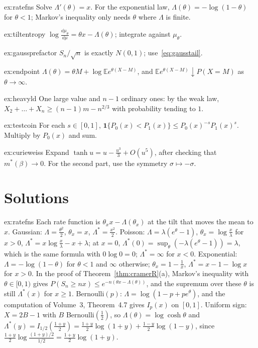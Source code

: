 \begin{hint}{ex:ratefns}
Solve $\Lambda'(\theta)=x$. For the exponential law, $\Lambda(\theta)=-\log(1-\theta)$ for $\theta<1$; Markov's inequality only needs $\theta$ where $\Lambda$ is finite.
\end{hint}
\begin{hint}{ex:tiltentropy}
$\log\frac{\dd\mu_\theta}{\dd\mu}=\theta x-\Lambda(\theta)$; integrate against $\mu_\theta$.
\end{hint}
\begin{hint}{ex:gaussprefactor}
$S_n/\sqrt n$ is exactly $N(0,1)$; use~\eqref{eq:gausstail}.
\end{hint}
\begin{hint}{ex:endpoint}
$\Lambda(\theta)=\theta M+\log\mathbb Ee^{\theta(X-M)}$, and $\mathbb Ee^{\theta(X-M)}\downarrow P(X=M)$ as $\theta\to\infty$.
\end{hint}
\begin{hint}{ex:heavyld}
One large value and $n-1$ ordinary ones: by the weak law, $X_2+\dots+X_n\ge(n-1)m-n^{2/3}$ with probability tending to $1$.
\end{hint}
\begin{hint}{ex:testcoin}
For each $s\in[0,1]$, $\mathbf 1\{P_0(x)<P_1(x)\}\le P_0(x)^{-s}P_1(x)^s$. Multiply by $P_0(x)$ and sum.
\end{hint}
\begin{hint}{ex:curieweiss}
Expand $\tanh u=u-\frac{u^3}3+O(u^5)$, after checking that $m^*(\beta)\to0$. For the second part, use the symmetry $\sigma\mapsto-\sigma$.
\end{hint}

\section{Solutions}

\begin{solution}{ex:ratefns}
\idea Each rate function is $\theta_xx-\Lambda(\theta_x)$ at the tilt that moves the mean to $x$.
\writeup Gaussian: $\Lambda=\frac{\theta^2}2$, $\theta_x=x$, $\Lambda^*=\frac{x^2}2$. Poisson: $\Lambda=\lambda(e^\theta-1)$, $\theta_x=\log\frac x\lambda$ for $x>0$, $\Lambda^*=x\log\frac x\lambda-x+\lambda$; at
$x=0$, $\Lambda^*(0)=\sup_\theta(-\lambda(e^\theta-1))=\lambda$, which is the same formula with $0\log0=0$; $\Lambda^*=\infty$ for $x<0$. Exponential: $\Lambda=-\log(1-\theta)$ for $\theta<1$ and $\infty$
otherwise; $\theta_x=1-\frac1x$, $\Lambda^*=x-1-\log x$ for $x>0$. In the proof of Theorem~\ref{thm:cramerR}(a), Markov's inequality with $\theta\in[0,1)$ gives
$P(S_n\ge nx)\le e^{-n(\theta x-\Lambda(\theta))}$, and the supremum over these $\theta$ is still $\Lambda^*(x)$ for $x\ge1$. Bernoulli$(p)$: $\Lambda=\log(1-p+pe^\theta)$, and the
computation of Volume~3, Theorem~4.7 gives $I_p(x)$ on $[0,1]$. Uniform sign: $X=2B-1$ with $B$ Bernoulli$(\frac12)$, so $\Lambda(\theta)=\log\cosh\theta$ and
$\Lambda^*(y)=I_{1/2}(\frac{1+y}2)=\frac{1+y}2\log(1+y)+\frac{1-y}2\log(1-y)$, since $\frac{1+y}2\log\frac{(1+y)/2}{1/2}=\frac{1+y}2\log(1+y)$.
\end{solution}

